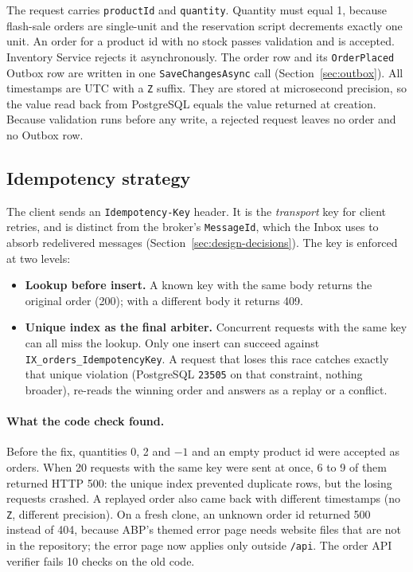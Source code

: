 \documentclass[a4paper]{report}
\begin{document}
The request carries \texttt{productId} and \texttt{quantity}. Quantity must
equal 1, because flash-sale orders are single-unit and the reservation script
decrements exactly one unit. An order for a product id with no stock passes
validation and is accepted. Inventory Service rejects it asynchronously. The
order row and its \texttt{OrderPlaced} Outbox row are
written in one \texttt{SaveChangesAsync} call (Section~\ref{sec:outbox}). All
timestamps are UTC with a \texttt{Z} suffix. They are stored at microsecond
precision, so the value read back from PostgreSQL equals the
value returned at creation. Because validation runs before any write, a
rejected request leaves no order and no Outbox row.

\subsection{Idempotency strategy}

The client sends an \texttt{Idempotency-Key} header. It is the
\emph{transport} key for client retries, and is distinct from the broker's
\texttt{MessageId}, which the Inbox uses to absorb redelivered messages
(Section~\ref{sec:design-decisions}). The key is enforced at two levels:

\begin{itemize}
  \item \textbf{Lookup before insert.} A known key with the same body returns
    the original order (200); with a different body it returns 409.
  \item \textbf{Unique index as the final arbiter.} Concurrent requests with
    the same key can all miss the lookup. Only one insert can succeed against
    \texttt{IX\_orders\_IdempotencyKey}. A request that loses this race catches
    exactly that unique violation (PostgreSQL \texttt{23505} on that
    constraint, nothing broader), re-reads the winning order and answers as a
    replay or a conflict.
\end{itemize}

\paragraph{What the code check found.} Before the fix, quantities 0, 2 and
$-1$ and an empty product id were accepted as orders. When 20 requests with
the same key were sent at once, 6 to 9 of them returned HTTP 500: the unique
index prevented duplicate rows, but the losing requests crashed. A replayed
order also came back with different timestamps (no \texttt{Z}, different
precision). On a fresh clone, an unknown order id returned 500 instead of 404,
because ABP's themed error page needs website files that are not in the
repository; the error page now applies only outside \texttt{/api}.
The order API verifier fails 10 checks on the old code.
\end{document}
